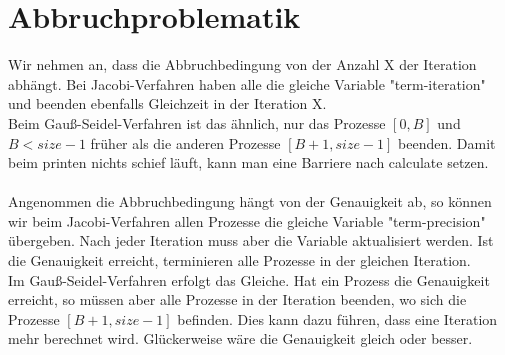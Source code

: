 \documentclass[fleqn]{article}
\begin{document}
\section{Abbruchproblematik}
Wir nehmen an, dass die Abbruchbedingung von der Anzahl X der Iteration abhängt.
Bei Jacobi-Verfahren haben alle die gleiche Variable "term-iteration" und beenden ebenfalls Gleichzeit in der Iteration X. \\
Beim Gauß-Seidel-Verfahren ist das ähnlich, nur das Prozesse $[0,B]$ und $B < size-1$ früher als die anderen Prozesse $[B+1,size-1]$ beenden. Damit beim printen nichts schief läuft, kann man eine Barriere nach calculate setzen.\\
\\
Angenommen die Abbruchbedingung hängt von der Genauigkeit ab, so können wir beim
Jacobi-Verfahren allen Prozesse die gleiche Variable "term-precision" übergeben. Nach jeder Iteration muss aber die Variable aktualisiert werden. Ist die Genauigkeit erreicht, terminieren alle Prozesse in der gleichen Iteration.\\
Im Gauß-Seidel-Verfahren erfolgt das Gleiche. Hat ein Prozess die Genauigkeit erreicht, so müssen aber alle Prozesse in der Iteration beenden, wo sich die Prozesse $[B+1,size-1]$
befinden. Dies kann dazu führen, dass eine Iteration mehr berechnet wird. Glückerweise wäre die Genauigkeit gleich oder besser.
\end{document}
